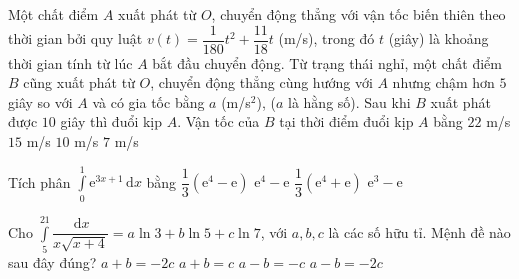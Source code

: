\begin{ex}%
	Một chất điểm $A$ xuất phát từ $O$, chuyển động thẳng với vận tốc biến thiên theo thời gian bởi quy luật $v(t)=\dfrac{1}{180}t^2+\dfrac{11}{18}t$ (m/s), trong đó $t$ (giây) là khoảng thời gian tính từ lúc $A$ bắt đầu chuyển động. Từ trạng thái nghỉ, một chất điểm $B$ cũng xuất phát từ $O$, chuyển động thẳng cùng hướng với $A$ nhưng chậm hơn $5$ giây so với $A$ và có gia tốc bằng $a$ (m/s$^2$), ($a$ là hằng số). Sau khi $B$ xuất phát được $10$ giây thì đuổi kịp $A$. Vận tốc của $B$ tại thời điểm đuổi kịp $A$ bằng
	\choice
	{$22$ m/s}
	{\True $15$ m/s}
	{$10$ m/s}
	{$7$ m/s}
\end{ex}

\begin{ex}%
	Tích phân $\displaystyle\int\limits_0^1\mathrm{e}^{3x+1}\mathrm{\,d}x$ bằng
	\choice
	{\True $\dfrac{1}{3}\left(\mathrm{e}^4-\mathrm{e}\right)$}
	{$\mathrm{e}^4-\mathrm{e}$}
	{$\dfrac{1}{3}\left(\mathrm{e}^4+\mathrm{e}\right)$}
	{$\mathrm{e}^3-\mathrm{e}$}
	\loigiai{
		\[ \displaystyle\int\limits_0^1\mathrm{e}^{3x+1}\mathrm{\,d}x =\dfrac{1}{3}\displaystyle\int\limits_0^1\mathrm{e}^{3x+1}\mathrm{d}(3x+1) =\dfrac{1}{3}\mathrm{e}^{3x+1}\bigg|_0^1 =\dfrac{1}{3}\left(\mathrm{e}^4-\mathrm{e}\right). \]
	}
\end{ex}

\begin{ex}%
	Cho $\displaystyle\int\limits_5^{21}\dfrac{\mathrm{\,d}x}{x\sqrt{x+4}}=a\ln 3+b\ln 5+c\ln 7$, với $a, b, c$ là các số hữu tỉ. Mệnh đề nào sau đây đúng?
	\choice
	{\True $a+b=-2c$}
	{$a+b=c$}
	{$a-b=-c$}
	{$a-b=-2c$}
\end{ex}

